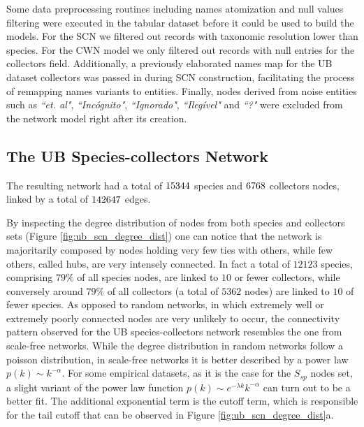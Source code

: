 Some data preprocessing routines including names atomization and null values filtering were executed in the tabular dataset before it could be used to build the models. 
For the SCN we filtered out records with taxonomic resolution lower than species.
For the CWN model we only filtered out records with null entries for the collectors field.
Additionally, a previously elaborated names map for the UB dataset collectors was passed in during SCN construction, facilitating the process of remapping names variants to entities. 
Finally, nodes derived from noise entities such as \textit{``et. al"}, \textit{``Incógnito"}, \textit{``Ignorado"}, \textit{``Ilegível"} and \textit{``?"} were excluded from the network model right after its creation.

\subsection{The UB Species-collectors Network}

The resulting network had a total of $15344$ species and $6768$ collectors nodes, linked by a total of $142647$ edges.

By inspecting the degree distribution of nodes from both species and collectors sets (Figure \ref{fig:ub_scn_degree_dist}) one can notice that the network is majoritarily composed by nodes holding very few ties with others, while few others, called hubs, are very intensely connected. 
In fact a total of $12123$ species, comprising $79\%$ of all species nodes, are linked to $10$ or fewer collectors, while conversely around $79\%$ of all collectors (a total of $5362$ nodes) are linked to $10$ of fewer species. 
As opposed to random networks, in which extremely well or extremely poorly connected nodes are very unlikely to occur, the connectivity pattern observed for the UB species-collectors network resembles the one from scale-free networks. While the degree distribution in random networks follow a poisson distribution, in scale-free networks it is better described by a power law $ p(k) \sim k^{-\alpha} $. For some empirical datasets, as it is the case for the $S_{sp}$ nodes set, a slight variant of the power law function $p(k) \sim e^{-\lambda k} k^{-\alpha}$ can turn out to be a better fit. The additional exponential term is the cutoff term, which is responsible for the tail cutoff that can be observed in Figure \ref{fig:ub_scn_degree_dist}a. 

